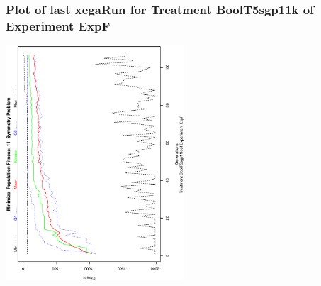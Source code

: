  \begin{frame}
 \frametitle{ Plot of last xegaRun for Treatment BoolT5sgp11k of Experiment ExpF }
 \begin{center}
\includegraphics[width=0.5\textwidth, angle=-90]
{ExpFPlotPopStatsFigure009.eps}
 \end{center}
 \label{report/ExpFPlotPopStatsFigure009.eps}  
 \end{frame}

